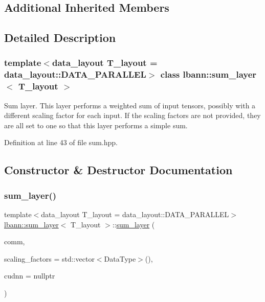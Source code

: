 \subsection*{Additional Inherited Members}


\subsection{Detailed Description}
\subsubsection*{template$<$data\+\_\+layout T\+\_\+layout = data\+\_\+layout\+::\+D\+A\+T\+A\+\_\+\+P\+A\+R\+A\+L\+L\+EL$>$\newline
class lbann\+::sum\+\_\+layer$<$ T\+\_\+layout $>$}

Sum layer. This layer performs a weighted sum of input tensors, possibly with a different scaling factor for each input. If the scaling factors are not provided, they are all set to one so that this layer performs a simple sum. 

Definition at line 43 of file sum.\+hpp.



\subsection{Constructor \& Destructor Documentation}
\mbox{\label{classlbann_1_1sum__layer_a00dfb715bda89ac6aaa10f045c9a49a5}} 
\subsubsection{\texorpdfstring{sum\+\_\+layer()}{sum\_layer()}}
{\footnotesize\ttfamily template$<$data\+\_\+layout T\+\_\+layout = data\+\_\+layout\+::\+D\+A\+T\+A\+\_\+\+P\+A\+R\+A\+L\+L\+EL$>$ \\
\hyperlink{classlbann_1_1sum__layer}{lbann\+::sum\+\_\+layer}$<$ T\+\_\+layout $>$\+::\hyperlink{classlbann_1_1sum__layer}{sum\+\_\+layer} (\begin{DoxyParamCaption}\item[{\hyperlink{classlbann_1_1lbann__comm}{lbann\+\_\+comm} $\ast$}]{comm,  }\item[{std\+::vector$<$ Data\+Type $>$}]{scaling\+\_\+factors = {\ttfamily std\+:\+:vector$<$DataType$>$()},  }\item[{\hyperlink{classlbann_1_1cudnn_1_1cudnn__manager}{cudnn\+::cudnn\+\_\+manager} $\ast$}]{cudnn = {\ttfamily nullptr} }\end{DoxyParamCaption})\hspace{0.3cm}{\ttfamily [inline]}}



